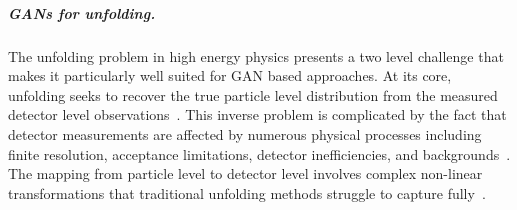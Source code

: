             \subparagraph{GANs for unfolding.}
                The unfolding problem in high energy physics presents a two level challenge that makes it particularly well suited for GAN based approaches.
                At its core, unfolding seeks to recover the true particle level distribution from the measured detector level observations~\cite{noauthor_statistics_2010, FreiburgHEP, Segura2024APhysics, Berger2017LectureATLAS, blobel_unfolding_2002}. 
                This inverse problem is complicated by the fact that detector measurements are affected by numerous physical processes including finite resolution, acceptance limitations, detector inefficiencies, and backgrounds~\cite{agostini_bayesian_2003, schmitt_tunfold_2012}.
                The mapping from particle level to detector level involves complex non-linear transformations that traditional unfolding methods struggle to capture fully~\cite{hocker_svd_1996, adye_unfolding_2011}.
                
